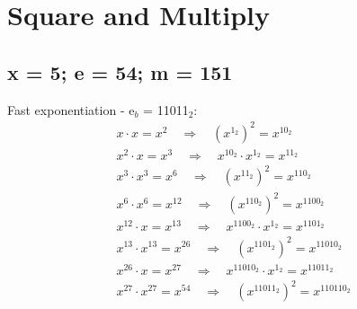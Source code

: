 \section{Square and Multiply}

\subsection{x = 5; e = 54; m = 151}
\label{sec:1a}
Fast exponentiation - e$_{b}$ = 11011$_{2}$: \\
\begin{equation}
\begin{split}
x \cdot x = x^{2} \quad\Rightarrow\quad (x^{1_{2}})^2 = x^{10_{2}} \\
x^{2} \cdot x = x^{3} \quad\Rightarrow\quad x^{10_{2}} \cdot x^{1_{2}} = x^{11_{2}} \\
x^{3} \cdot x^{3} = x^{6} \quad\Rightarrow\quad (x^{11_{2}})^2 = x^{110_{2}} \\
x^{6} \cdot x^{6} = x^{12} \quad\Rightarrow\quad (x^{110_{2}})^2 = x^{1100_{2}} \\
x^{12} \cdot x = x^{13} \quad\Rightarrow\quad x^{1100_{2}} \cdot x^{1_{2}} = x^{1101_{2}} \\
x^{13} \cdot x^{13} = x^{26} \quad\Rightarrow\quad (x^{1101_{2}})^2 = x^{11010_{2}} \\
x^{26} \cdot x = x^{27} \quad\Rightarrow\quad x^{11010_{2}} \cdot x^{1_{2}} = x^{11011_{2}} \\
x^{27} \cdot x^{27} = x^{54} \quad\Rightarrow\quad (x^{11011_{2}})^2 = x^{110110_{2}} 
\end{split}
\end{equation}

